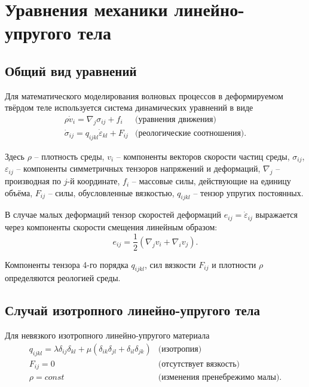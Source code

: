 \section{Уравнения механики линейно-упругого тела}

\subsection{Общий вид уравнений}
\label{model}

Для математического моделирования волновых процессов в деформируемом твёрдом
теле используется система динамических уравнений \cite{sedov} в виде
\begin{eqnarray}
	\label{initial_equations}
	\rho\dot{v}_i=\nabla_j\sigma_{ij}+f_i & \textrm{(уравнения движения)}\nonumber\\
	\dot{\sigma}_{ij}=q_{ijkl}\dot{\varepsilon}_{kl}+F_{ij} & \textrm{(реологические соотношения).}
\end{eqnarray}

Здесь $\rho$ – плотность среды, $v_i$ – компоненты векторов скорости частиц среды,
$\sigma_{ij}$, $\varepsilon_{ij}$ -- компоненты симметричных тензоров напряжений и деформаций,
$\nabla_j$ – производная по $j$-й координате, $f_i$ – массовые
силы, действующие на единицу объёма, $F_{ij}$ -- силы, обусловленные вязкостью, $q_{ijkl}$ -- 
тензор упругих постоянных.

В случае малых деформаций тензор скоростей деформаций $e_{ij}=\dot{\varepsilon}_{ij}$ 
выражается через компоненты скорости смещения линейным образом:
\begin{equation}
	e_{ij}=\frac{1}{2}(\nabla_j v_i+\nabla_i v_j).
\end{equation}

Компоненты тензора 4-го порядка $q_{ijkl}$, сил вязкости $F_{ij}$ и плотности $\rho$ определяются реологией среды. 

\subsection{Случай изотропного линейно-упругого тела}
Для невязкого изотропного линейно-упругого материала
\begin{eqnarray}
	\label{isotropic_tensor}
	q_{ijkl}=\lambda\delta_{ij}\delta_{kl}+\mu(\delta_{ik}\delta_{jl}+\delta_{il}
	\delta_{jk}) & \textrm {(изотропия)} \nonumber\\
	F_{ij}=0 & \textrm {(отсутствует вязкость)} \\
	\rho=const & \textrm {(изменения пренебрежимо малы)}.
\end{eqnarray}

